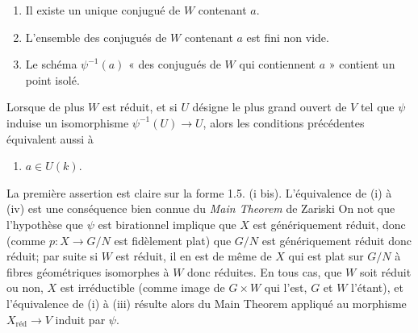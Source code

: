 \documentclass[11pt,a4paper]{article}
\begin{document}
\begin{enumerate}
  \item[(i)] Il existe un unique conjugué de $W$ contenant $a$.
  \item[(ii)] L'ensemble des conjugués de $W$ contenant $a$ est fini non vide.
  \item[(iii)] Le schéma $\psi^{-1}(a)$ « des conjugués de $W$ qui
  contiennent $a$ » contient un point isolé.
\end{enumerate}



Lorsque de plus $W$ est réduit, et si $U$ désigne le plus grand ouvert de $V$
tel que $\psi$ induise un isomorphisme $\psi^{-1}(U) \to U$, alors les
conditions précédentes équivalent aussi à

\begin{enumerate}
  \item[(iv)] $a \in U(k)$.
\end{enumerate}

La première assertion est claire sur la forme 1.5. (i bis). L'équivalence de
(i) à (iv) est une conséquence bien connue du \emph{Main Theorem} de
Zariski On not que \struck{\ill{}} l'hypothèse que
$\psi$ est birationnel implique que $X$ est génériquement réduit, donc (comme
$p : X \to G/N$ est fidèlement plat) que $G/N$ est génériquement réduit donc
réduit; par suite si $W$ est réduit, il en est de même de $X$ qui est plat
sur $G/N$ à fibres géométriques isomorphes à $W$ donc réduites. En tous cas,
que $W$ soit réduit ou non, $X$ est irréductible (comme image de $G \times W$
qui l'est, $G$ et $W$ l'étant), et l'équivalence de (i) à (iii) résulte alors
du Main Theorem appliqué au morphisme $X_{\mathrm{réd}} \to V$ induit par
$\psi$.
\end{document}
